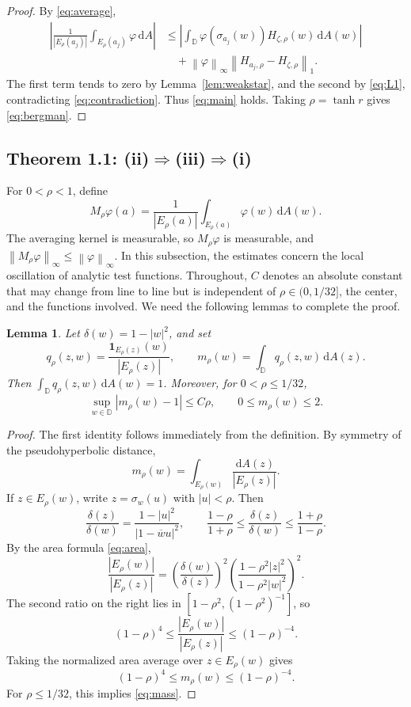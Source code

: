 \documentclass[12pt,a4paper]{article}
\newtheorem{lemma}[theorem]{Lemma}
\theoremstyle{remark}
\newcommand{\D}{\mathbb D}
\newcommand{\dA}{\,\mathrm dA}
\newcommand{\norm}[1]{\left\lVert#1\right\rVert}
\newcommand{\abs}[1]{\left\lvert#1\right\rvert}
\begin{document}
\begin{proof}
By \eqref{eq:average},
\begin{align*}
\abs{\frac1{|E_\rho(a_j)|}\int_{E_\rho(a_j)}\varphi\dA}
&\le\abs{\int_\D\varphi(\sigma_{a_j}(w))H_{\zeta,\rho}(w)\dA(w)}\\
&\quad+\norm\varphi_\infty\norm{H_{a_j,\rho}-H_{\zeta,\rho}}_1.
\end{align*}
The first term tends to zero by Lemma~\ref{lem:weakstar}, and the second by \eqref{eq:L1}, contradicting \eqref{eq:contradiction}.
Thus \eqref{eq:main} holds. Taking $\rho=\tanh r$ gives \eqref{eq:bergman}.
\end{proof}
\subsection{Theorem 1.1: \texorpdfstring{\textnormal{(ii)}$\Rightarrow$\textnormal{(iii)}$\Rightarrow$\textnormal{(i)}}{(ii) implies (iii) implies (i)}}
\label{sec:approx}
For $0<\rho<1$, define
\[
M_\rho\varphi(a)=\frac1{|E_\rho(a)|}\int_{E_\rho(a)}\varphi(w)\dA(w).
\]
The averaging kernel is measurable, so $M_\rho\varphi$ is measurable, and
$\norm{M_\rho\varphi}_\infty\le\norm\varphi_\infty$.
In this subsection, the estimates concern the local oscillation of analytic test functions. Throughout, $C$ denotes an absolute constant that may change from line to line but is independent of $\rho\in(0,1/32]$, the center, and the functions involved. We need the following lemmas to complete the proof.

\begin{lemma}\label{lem:mass}
Let $\delta(w)=1-|w|^2$, and set
\[
q_\rho(z,w)=\frac{\mathbf1_{E_\rho(z)}(w)}{|E_\rho(z)|},
\qquad m_\rho(w)=\int_\D q_\rho(z,w)\dA(z).
\]
Then $\int_\D q_\rho(z,w)\dA(w)=1$. Moreover, for $0<\rho\le1/32$,
\begin{equation}\label{eq:mass}
\sup_{w\in\D}|m_\rho(w)-1|\le C\rho,
\qquad 0\le m_\rho(w)\le2.
\end{equation}
\end{lemma}
\begin{proof}
The first identity follows immediately from the definition. By symmetry of the pseudohyperbolic distance,
\[
m_\rho(w)=\int_{E_\rho(w)}\frac{\dA(z)}{|E_\rho(z)|}.
\]
If $z\in E_\rho(w)$, write $z=\sigma_w(u)$ with $|u|<\rho$. Then
\[
\frac{\delta(z)}{\delta(w)}=\frac{1-|u|^2}{|1-\overline w u|^2},
\qquad
\frac{1-\rho}{1+\rho}\le\frac{\delta(z)}{\delta(w)}
\le\frac{1+\rho}{1-\rho}.
\]
By the area formula \eqref{eq:area},
\[
\frac{|E_\rho(w)|}{|E_\rho(z)|}
=\left(\frac{\delta(w)}{\delta(z)}\right)^2
 \left(\frac{1-\rho^2|z|^2}{1-\rho^2|w|^2}\right)^2.
\]
The second ratio on the right lies in $[1-\rho^2,(1-\rho^2)^{-1}]$, so
\[
(1-\rho)^4\le\frac{|E_\rho(w)|}{|E_\rho(z)|}\le(1-\rho)^{-4}.
\]
Taking the normalized area average over $z\in E_\rho(w)$ gives
\[
(1-\rho)^4\le m_\rho(w)\le(1-\rho)^{-4}.
\]
For $\rho\le1/32$, this implies \eqref{eq:mass}.
\end{proof}
\end{document}

